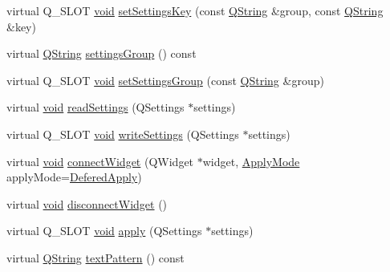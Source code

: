 \begin{DoxyCompactItemize}
\item 
virtual Q\-\_\-\-S\-L\-O\-T \hyperlink{group___u_a_v_objects_plugin_ga444cf2ff3f0ecbe028adce838d373f5c}{void} \hyperlink{class_utils_1_1_saved_action_a105d85462675a59292570f6de41faf7d}{set\-Settings\-Key} (const \hyperlink{group___u_a_v_objects_plugin_gab9d252f49c333c94a72f97ce3105a32d}{Q\-String} \&group, const \hyperlink{group___u_a_v_objects_plugin_gab9d252f49c333c94a72f97ce3105a32d}{Q\-String} \&key)
\item 
virtual \hyperlink{group___u_a_v_objects_plugin_gab9d252f49c333c94a72f97ce3105a32d}{Q\-String} \hyperlink{class_utils_1_1_saved_action_afa3559d7166402cf75ba466f10f16140}{settings\-Group} () const 
\item 
virtual Q\-\_\-\-S\-L\-O\-T \hyperlink{group___u_a_v_objects_plugin_ga444cf2ff3f0ecbe028adce838d373f5c}{void} \hyperlink{class_utils_1_1_saved_action_acbc43194d58d458373ad8b4df4ef091d}{set\-Settings\-Group} (const \hyperlink{group___u_a_v_objects_plugin_gab9d252f49c333c94a72f97ce3105a32d}{Q\-String} \&group)
\item 
virtual \hyperlink{group___u_a_v_objects_plugin_ga444cf2ff3f0ecbe028adce838d373f5c}{void} \hyperlink{class_utils_1_1_saved_action_a42f64ef2508f9baa33da4f0c37db670c}{read\-Settings} (Q\-Settings $\ast$settings)
\item 
virtual Q\-\_\-\-S\-L\-O\-T \hyperlink{group___u_a_v_objects_plugin_ga444cf2ff3f0ecbe028adce838d373f5c}{void} \hyperlink{class_utils_1_1_saved_action_abe287a9257381ac7fe3d08128380cd24}{write\-Settings} (Q\-Settings $\ast$settings)
\item 
virtual \hyperlink{group___u_a_v_objects_plugin_ga444cf2ff3f0ecbe028adce838d373f5c}{void} \hyperlink{class_utils_1_1_saved_action_a957c40a1ba916fd9f3073bfab6d22dd2}{connect\-Widget} (Q\-Widget $\ast$widget, \hyperlink{namespace_utils_ac2d001247aaff664db3acdb312344458}{Apply\-Mode} apply\-Mode=\hyperlink{namespace_utils_ac2d001247aaff664db3acdb312344458a6081d5dba39502dab03be7d2eb297166}{Defered\-Apply})
\item 
virtual \hyperlink{group___u_a_v_objects_plugin_ga444cf2ff3f0ecbe028adce838d373f5c}{void} \hyperlink{class_utils_1_1_saved_action_af7478eb16c4cbd16e49d303a13cb1c03}{disconnect\-Widget} ()
\item 
virtual Q\-\_\-\-S\-L\-O\-T \hyperlink{group___u_a_v_objects_plugin_ga444cf2ff3f0ecbe028adce838d373f5c}{void} \hyperlink{class_utils_1_1_saved_action_a55ba45bf726930f8ad0beac52ae4f831}{apply} (Q\-Settings $\ast$settings)
\item 
virtual \hyperlink{group___u_a_v_objects_plugin_gab9d252f49c333c94a72f97ce3105a32d}{Q\-String} \hyperlink{class_utils_1_1_saved_action_a814f8ad7cf6576f6b227226189a5787e}{text\-Pattern} () const 

\end{DoxyCompactItemize}
